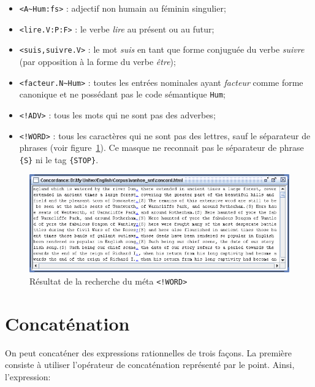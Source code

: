 \begin{itemize}
  \item \verb$<A~Hum:fs>$ : adjectif non humain au féminin singulier;
  \item \verb+<lire.V:P:F>+ : le verbe \textit{lire} au présent ou au futur;
  \item \verb$<suis,suivre.V>$ : le mot \textit{suis} en tant que forme conjuguée du verbe
  	  \textit{suivre}
  	  (par opposition à la forme du verbe \textit{être});
  \item \verb$<facteur.N~Hum>$ : toutes les entrées nominales ayant \textit{facteur} comme forme
  	  canonique et ne possédant pas le code sémantique \verb+Hum+;
  \item \verb$<!ADV>$ : tous les mots qui ne sont pas des adverbes;
  \item \verb$<!WORD>$ : tous les caractères qui ne sont pas des lettres, sauf le séparateur de
  	  phrases
  	  (voir figure~\ref{fig-search-<!WORD>}). Ce masque ne reconnait pas le séparateur de phrase
  	  \verb+{S}+
  	  ni le tag \verb+{STOP}+.
\end{itemize}

\bigskip
\begin{figure}[h]
\begin{center}
\includegraphics[width=15cm]{resources/img/fig4-2.png}
\caption{Résultat de la recherche du méta
\texttt{<!WORD>}\label{fig-search-<!WORD>}}
\end{center}
\end{figure}

\section{Concaténation}

On peut concaténer des expressions rationnelles de trois façons. La première consiste à
utiliser l’opérateur de concaténation représenté par le point. Ainsi, l’expression:

